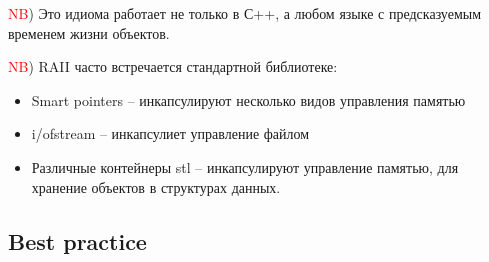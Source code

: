 \textcolor{red}{NB}) Это идиома работает не только в С++, а любом языке с предсказуемым временем жизни объектов.

\textcolor{red}{NB}) RAII часто встречается стандартной библиотеке:
\begin{itemize}
\item Smart pointers -- инкапсулируют несколько видов управления памятью
\item i/ofstream -- инкапсулиет управление файлом
\item Различные контейнеры stl -- инкапсулируют управление памятью, для хранение объектов в структурах данных.
\end{itemize}

\subsection{Best practice}

